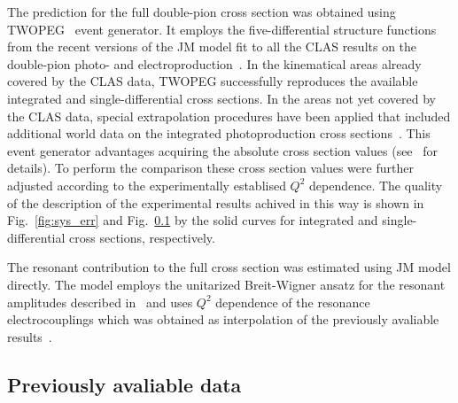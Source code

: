 \documentclass[prc,twocolumn,superscriptaddress,showpacs,amssymb,amsmath,amsfonts,linenumbers,aps]{revtex4-1}
\begin{document}
The prediction for the full double-pion cross section was obtained using TWOPEG~\cite{Skorodum:EG} event generator.
It employs the five-differential structure functions from the recent versions of the JM model fit to all the CLAS results on the double-pion photo- and electroproduction~\cite{Ripani:2002ss,Mokeev:2012vsa,Fedotov:2008aa,Golovach:note}. 
In the kinematical areas already covered by the CLAS data, TWOPEG successfully reproduces the available integrated and single-differential cross sections. 
In the areas not yet covered by the CLAS data, special
extrapolation procedures have been applied that included additional world data on the integrated photoproduction cross sections~\cite{Wu:2005wf,ABBHHM:1968aa}. 
This event generator advantages acquiring the absolute cross section values (see~\cite{Skorodum:EG} for details).
To perform the comparison these cross section values were further adjusted according to the experimentally establised $Q^{2}$ dependence.
The quality of the description of the experimental results achived in this way is shown in  Fig.~\ref{fig:sys_err} and Fig.~\ref{} by the solid curves for integrated and single-differential cross sections, respectively.

The resonant contribution to the full cross section was estimated using JM model directly. The model employs
the unitarized Breit-Wigner ansatz for the resonant amplitudes described in~\cite{Mokeev:2012vsa} and uses $Q^{2}$ dependence of the 
resonance electrocouplings which was obtained as interpolation of the previously avaliable results~\cite{Dugger:2009pn,Aznauryan:2009mx,Mokeev:2012vsa,Mokeev:2015lda,Aznauryan:2009mx,Dalton:2008aa,Denizli:2007tq,Thompson:2000by,Armstrong:1998wg,Burkert:2002zz,Park:2014yea,Tiator:2011pw,Agashe:2014kda}. 












\subsection{Previously avaliable data}
\end{document}
